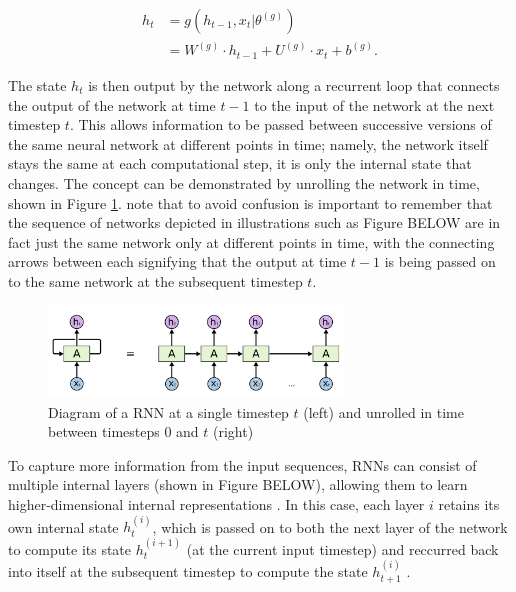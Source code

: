 \documentclass[a4paper, 11pt]{report}
\begin{document}
    \begin{align}
        \label{eq: rnn-state}
        h_t &= g( h_{t-1}, x_t \vert \theta^{(g)} ) \\
        &= W^{(g)} \cdot h_{t-1} + U^{(g)} \cdot x_t + b^{(g)}
        \text{.}
    \end{align}

    The state $h_t$ is then output by the network along a recurrent loop that connects the output of the network at time $t-1$ to the input of the network at the next timestep $t$. This allows information to be passed between successive versions of the same neural network at different points in time; namely, the network itself stays the same at each computational step, it is only the internal state that changes. The concept can be demonstrated by unrolling the network in time, shown in Figure \ref{fig: rnn-diagram}. \citet{tsantekidis-2022} note that to avoid confusion is important to remember that the sequence of networks depicted in illustrations such as Figure BELOW are in fact just the same network only at different points in time, with the connecting arrows between each signifying that the output at time $t-1$ is being passed on to the same network at the subsequent timestep $t$.

    \begin{figure}[ht]
        \label{fig: rnn-diagram}
        \centering
        \includegraphics[width=0.7\textwidth]{rnn.png}
        \caption{\centering Diagram of a RNN at a single timestep $t$ (left) and unrolled in time between timesteps $0$ and $t$ (right)}
    \end{figure}

    To capture more information from the input sequences, RNNs can consist of multiple internal layers (shown in Figure BELOW), allowing them to learn higher-dimensional internal representations \citep{bengio-2009}. In this case, each layer $i$ retains its own internal state $h^{(i)}_t$, which is passed on to both the next layer of the network to compute its state $h^{(i+1)}_t$ (at the current input timestep) and reccurred back into itself at the subsequent timestep to compute the state $h^{(i)}_{t+1}$ \citep{zhang-2021}. 
\end{document}
